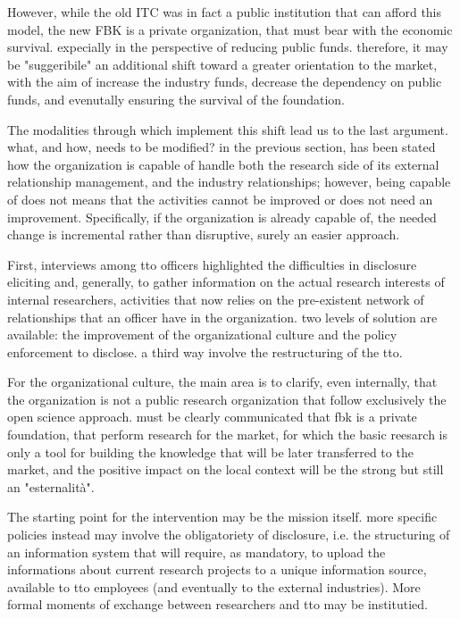 However, while the old ITC was in fact a public institution that can afford this model, the new FBK is a private organization, that must bear with the economic survival. expecially in the perspective of reducing public funds. therefore, it may be "suggeribile" an additional shift toward a greater orientation to the market, with the aim of increase the industry funds, decrease the dependency on public funds, and evenutally ensuring the survival of the foundation.

The modalities through which implement this shift lead us to the last argument. what, and how, needs to be modified? in the previous section, has been stated how the organization is capable of handle both the research side of its external relationship management, and the industry relationships; however, being capable of does not means that the activities cannot be improved or does not need an improvement. Specifically, if the organization is already capable of, the needed change is incremental rather than disruptive, surely an easier approach.

First, interviews among tto officers highlighted the difficulties in disclosure eliciting and, generally, to gather information on the actual research interests of internal researchers, activities that now relies on the pre-existent network of relationships that an officer have in the organization. two levels of solution are available: the improvement of the organizational culture and the policy enforcement to disclose. a third way involve the restructuring of the tto.

For the organizational culture, the main area is to clarify, even internally, that the organization is not a public research organization that follow exclusively the open science approach. must be clearly communicated that fbk is a private foundation, that perform research for the market, for which the basic reesarch is only a tool for building the knowledge that will be later transferred to the market, and the positive impact on the local context will be the strong but still an "esternalità". 

The starting point for the intervention may be the mission itself. more specific policies instead may involve the obligatoriety of disclosure, i.e. the structuring of an information system that will require, as mandatory, to upload the informations about current research projects to a unique information source, available to tto employees (and eventually to the external industries). More formal moments of exchange between researchers and tto may be institutied.

